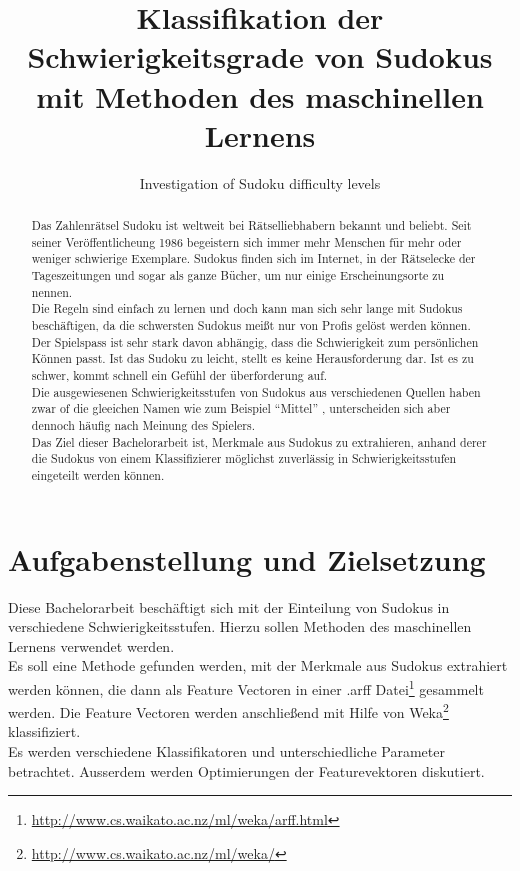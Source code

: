 \documentclass[accentcolor=tud6b,11pt,paper=a4]{tudreport}
\title{Klassifikation der Schwierigkeitsgrade von Sudokus mit Methoden des maschinellen Lernens}
\subtitle{Investigation of Sudoku difficulty levels}
\begin{document}
\maketitle

\begin{abstract}
Das Zahlenrätsel Sudoku ist weltweit bei Rätselliebhabern bekannt und beliebt. Seit seiner Veröffentlicheung 1986 begeistern sich immer mehr Menschen für mehr oder weniger schwierige Exemplare. Sudokus finden sich im Internet, in der Rätselecke der Tageszeitungen und sogar als ganze Bücher, um nur einige Erscheinungsorte zu nennen. \\
Die Regeln sind einfach zu lernen und doch kann man sich sehr lange mit Sudokus beschäftigen, da die schwersten Sudokus meißt nur von Profis gelöst werden können.\\
Der Spielspass ist sehr stark davon abhängig, dass die Schwierigkeit zum persönlichen Können passt. Ist das Sudoku zu leicht, stellt es keine Herausforderung dar. Ist es zu schwer, kommt schnell ein Gefühl der überforderung auf. \\
Die ausgewiesenen Schwierigkeitsstufen von Sudokus aus verschiedenen Quellen haben zwar of die gleeichen Namen wie zum Beispiel 
\textquotedblleft Mittel\textquotedblright
, unterscheiden sich aber dennoch häufig nach Meinung des Spielers.\\
Das Ziel dieser Bachelorarbeit ist, Merkmale aus Sudokus zu extrahieren, anhand derer die Sudokus von einem Klassifizierer möglichst zuverlässig in Schwierigkeitsstufen eingeteilt werden können.\\
\end{abstract}

\tableofcontents

\chapter{Aufgabenstellung und Zielsetzung}
Diese Bachelorarbeit beschäftigt sich mit der Einteilung von Sudokus in verschiedene Schwierigkeitsstufen. Hierzu sollen Methoden des maschinellen Lernens verwendet werden. \\ Es soll eine Methode gefunden werden, mit der Merkmale aus Sudokus extrahiert werden können, die dann als Feature Vectoren in einer .arff Datei\footnote{\url{http://www.cs.waikato.ac.nz/ml/weka/arff.html}} gesammelt werden. Die Feature Vectoren werden anschließend mit Hilfe von Weka\footnote{\url{http://www.cs.waikato.ac.nz/ml/weka/}} klassifiziert.\\
Es werden verschiedene Klassifikatoren und unterschiedliche Parameter betrachtet. Ausserdem werden Optimierungen der Featurevektoren diskutiert.
\end{document}
